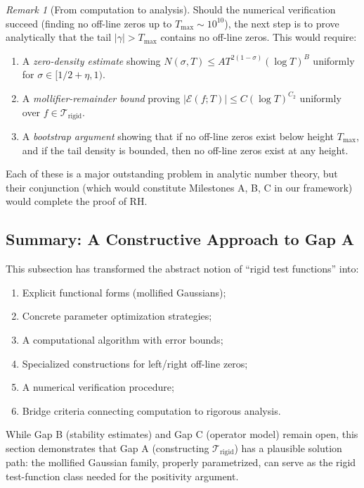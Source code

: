 \documentclass[11pt]{article}
\theoremstyle{plain}
\theoremstyle{definition}
\theoremstyle{remark}
\newtheorem{remark}[theorem]{Remark}
\begin{document}
\begin{remark}[From computation to analysis]
Should the numerical verification succeed (finding no off-line zeros up to $T_{\max}\sim 10^{10}$),
the next step is to prove analytically that the tail $|\gamma|>T_{\max}$ contains no off-line zeros.
This would require:

\begin{enumerate}
  \item A \emph{zero-density estimate} showing $N(\sigma,T)\le A T^{2(1-\sigma)}(\log T)^B$ uniformly for $\sigma\in[1/2+\eta, 1)$.

  \item A \emph{mollifier-remainder bound} proving $|\mathcal{E}(f;T)| \le C(\log T)^{C_2}$ uniformly over $f\in\mathcal{T}_{\mathrm{rigid}}$.

  \item A \emph{bootstrap argument} showing that if no off-line zeros exist below height $T_{\max}$,
  and if the tail density is bounded, then no off-line zeros exist at any height.
\end{enumerate}

Each of these is a major outstanding problem in analytic number theory,
but their conjunction (which would constitute Milestones A, B, C in our framework) would complete the proof of RH.
\end{remark}

\subsection*{Summary: A Constructive Approach to Gap A}

This subsection has transformed the abstract notion of ``rigid test functions'' into:
\begin{enumerate}
  \item Explicit functional forms (mollified Gaussians);
  \item Concrete parameter optimization strategies;
  \item A computational algorithm with error bounds;
  \item Specialized constructions for left/right off-line zeros;
  \item A numerical verification procedure;
  \item Bridge criteria connecting computation to rigorous analysis.
\end{enumerate}

While Gap B (stability estimates) and Gap C (operator model) remain open,
this section demonstrates that Gap A (constructing $\mathcal{T}_{\mathrm{rigid}}$)
has a plausible solution path: the mollified Gaussian family, properly parametrized,
can serve as the rigid test-function class needed for the positivity argument.
\end{document}
